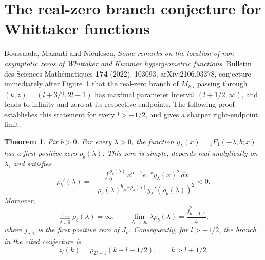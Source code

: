 \documentclass[11pt,a4paper]{article}
\newtheorem{theorem}{Theorem}[section]
\theoremstyle{definition}
\theoremstyle{remark}
\numberwithin{equation}{section}
\begin{document}
\section{The real-zero branch conjecture for Whittaker functions}
\label{p2:sec:whittaker-branch}

Boussaada, Mazanti and Niculescu, \emph{Some remarks on the location of
non-asymptotic zeros of Whittaker and Kummer hypergeometric functions},
Bulletin des Sciences Math\'ematiques \textbf{174} (2022), 103093,
arXiv:2106.03378, conjecture immediately after Figure~1 that the real-zero
branch of $M_{k,l}$ passing through $(k,z)=(l+3/2,2l+1)$ has maximal
parameter interval $(l+1/2,\infty)$, and tends to infinity and zero at its
respective endpoints. The following proof establishes this statement for
every $l>-1/2$, and gives a sharper right-endpoint limit.

\begin{theorem}\label{p2:thm:whittaker-branch}
Fix $b>0$. For every $\lambda>0$, the function
$y_\lambda(x)={}_1F_1(-\lambda;b;x)$ has a first positive zero
$\rho_b(\lambda)$. This zero is simple, depends real analytically on
$\lambda$, and satisfies
\[
 \rho_b'(\lambda)=
 -\frac{\displaystyle\int_0^{\rho_b(\lambda)}
 x^{b-1}e^{-x}y_\lambda(x)^2\,dx}
 {\rho_b(\lambda)^b e^{-\rho_b(\lambda)}
   y_\lambda'(\rho_b(\lambda))^2}<0.
\]
Moreover,
\[
 \lim_{\lambda\downarrow0}\rho_b(\lambda)=\infty,
 \qquad
 \lim_{\lambda\to\infty}\lambda\rho_b(\lambda)
   =\frac{j_{b-1,1}^{2}}4,
\]
where $j_{\nu,1}$ is the first positive zero of $J_\nu$.
Consequently, for $l>-1/2$, the branch in the cited conjecture is
\[
 z_l(k)=\rho_{2l+1}(k-l-1/2),\qquad k>l+1/2.
\]
\end{theorem}
\end{document}
